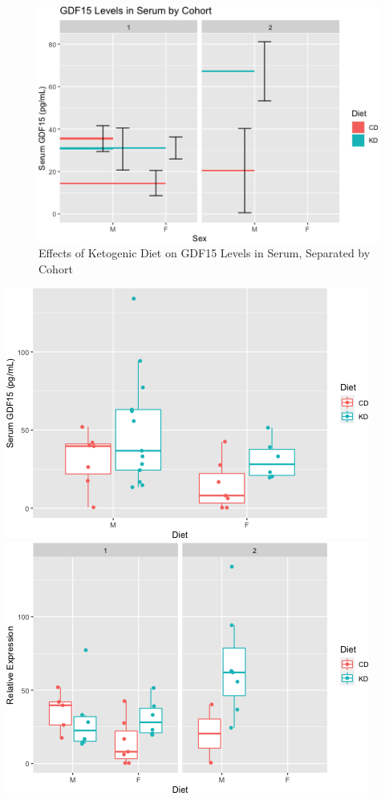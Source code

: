 \documentclass[]{article}
\begin{document}
\begin{figure}
\centering
\includegraphics{figures/kd-gdf15-barplots-cohort-1.png}
\caption{Effects of Ketogenic Diet on GDF15 Levels in Serum, Separated
by Cohort}
\end{figure}

\includegraphics{figures/kd-gdf15-boxplots-1.png}
\includegraphics{figures/kd-gdf15-boxplots-2.png}
\end{document}
